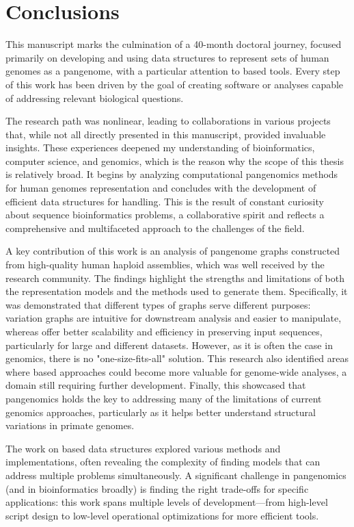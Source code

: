 \chapter{Conclusions}
\label{sec:conclusions}
This manuscript marks the culmination of a 40-month doctoral journey, focused primarily on developing and using data structures to represent sets of human genomes as a pangenome, with a particular attention to \kmer based tools. Every step of this work has been driven by the goal of creating software or analyses capable of  addressing relevant biological questions.

The research path was nonlinear, leading to collaborations in various projects that, while not all directly presented in this manuscript, provided invaluable insights. These experiences deepened my understanding of bioinformatics, computer science, and genomics, which is the reason why the scope of this thesis is relatively broad. It begins by analyzing computational pangenomics methods for human genomes representation and concludes with the development of efficient data structures for \kmer handling. This is the result of constant curiosity about sequence bioinformatics problems, a collaborative spirit and reflects a comprehensive and multifaceted approach to the challenges of the field.

A key contribution of this work is an analysis of pangenome graphs constructed from high-quality human haploid assemblies, which was well received by the research community. The findings highlight the strengths and limitations of both the representation models and the methods used to generate them. Specifically, it was demonstrated that different types of graphs serve different purposes: variation graphs are intuitive for downstream analysis and easier to manipulate, whereas \dbgs offer better scalability and efficiency in preserving input sequences, particularly for large and different datasets. However, as it is often the case in genomics, there is no "one-size-fits-all" solution. This research also identified areas where \kmer based approaches could become more valuable for genome-wide analyses, a domain still requiring further development. Finally, this showcased that pangenomics holds the key to addressing many of the limitations of current genomics approaches, particularly as it helps better understand structural variations in primate genomes.

The work on \kmer based data structures explored various methods and implementations, often revealing the complexity of finding models that can address multiple problems simultaneously. A significant challenge in pangenomics (and in bioinformatics broadly) is finding the right trade-offs for specific applications: this work spans multiple levels of development—from high-level script design to low-level operational optimizations for more efficient tools.

